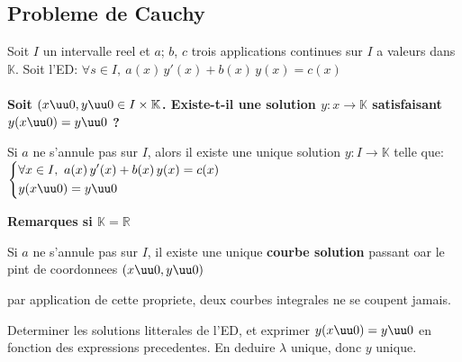 \documentclass[12pt,twoside,a4paper]{article}
\begin{document}
		\subsection{Probleme de Cauchy}
			Soit $I$ un intervalle reel et $a$; $b$, $c$ trois applications continues sur $I$ a valeurs dans $\mathbb{K}$.
			Soit l'ED: $\forall s\in I,\ a(x)\,y'(x)+b(x)\,y(x)=c(x)$\\
			\\
			\textbf{Soit $(x\uu0,y\uu0\in I\times\mathbb{K}$. Existe-t-il une solution $y:x\rightarrow\mathbb{K}$ satisfaisant $y(x\uu0)=y\uu0$ ?}
			\begin{prop}
				Si $a$ ne s'annule pas sur $I$, alors il existe une unique solution $y:I\rightarrow\mathbb{K}$ telle que:\\
				$\left\{\begin{aligned}&\forall x\in I,\ a(x)\,y'(x)+b(x)\,y(x)=c(x)\\&y(x\uu0)=y\uu0\end{aligned}\right.$
			\end{prop}
			\textbf{Remarques si $\mathbb{K=R}$}
			\begin{liste}
				\item Si $a$ ne s'annule pas sur $I$, il existe une unique \textbf{courbe solution} passant oar le pint de coordonnees $(x\uu0,y\uu0)$
				\item par application de cette propriete, deux courbes integrales ne se coupent jamais.
			\end{liste}
			\begin{preuve}
				Determiner les solutions litterales de l'ED, et exprimer $y(x\uu0)=y\uu0$ en fonction des expressions precedentes. En deduire $\lambda$ unique, donc $y$ unique.
			\end{preuve}
\end{document}
